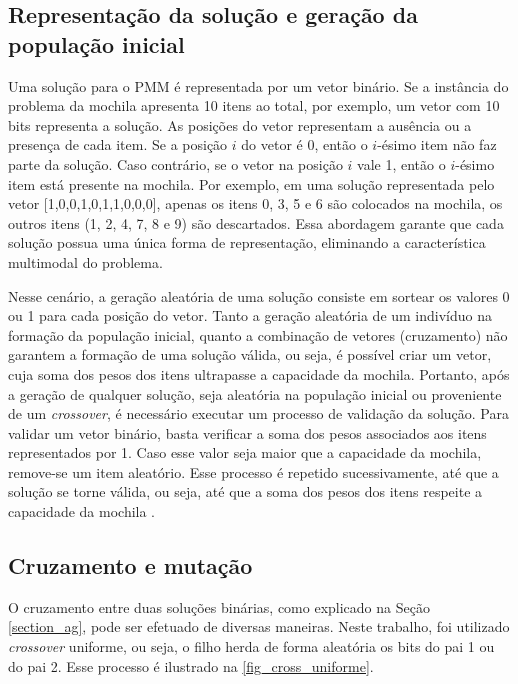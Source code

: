 \subsection{Representação da solução e geração da população inicial}
\label{section_representacao_pmm}
Uma solução para o PMM é representada por um vetor binário. Se a instância do problema da mochila apresenta 10 itens ao total, por exemplo, um vetor com 10 bits representa a solução. As posições do vetor representam a ausência ou a presença de cada item. Se a posição $i$ do vetor é 0, então o $i$-ésimo item não faz parte da solução. Caso contrário, se o vetor na posição $i$ vale 1, então o  $i$-ésimo item está presente na mochila. Por exemplo, em uma solução representada pelo vetor [1,0,0,1,0,1,1,0,0,0], apenas os itens 0, 3, 5 e 6 são colocados na mochila, os outros itens (1, 2, 4, 7, 8 e 9) são descartados. Essa abordagem garante que cada solução possua uma única forma de representação, eliminando a característica multimodal do problema.

Nesse cenário, a geração aleatória de uma solução consiste em sortear os valores 0 ou 1 para cada posição do vetor. Tanto a geração aleatória de um indivíduo na formação da população inicial, quanto a combinação de vetores (cruzamento) não garantem a formação de uma solução válida, ou seja, é possível criar um vetor, cuja soma dos pesos dos itens ultrapasse a capacidade da mochila. Portanto, após a geração de qualquer solução, seja aleatória na população inicial ou proveniente de um \textit{crossover}, é necessário executar um processo de validação da solução. Para validar um vetor binário, basta verificar a soma dos pesos associados aos itens representados por 1. Caso esse valor seja maior que a capacidade da mochila, remove-se um item aleatório. Esse processo é repetido sucessivamente, até que a solução se torne válida, ou seja, até que a soma dos pesos dos itens respeite a capacidade da mochila \cite{Ishibuchi2015}.

\subsection{Cruzamento e mutação}
O cruzamento entre duas soluções binárias, como explicado na Seção \ref{section_ag}, pode ser efetuado de diversas maneiras. Neste trabalho, foi utilizado \textit{crossover} uniforme, ou seja, o filho herda de forma aleatória os bits do pai 1 ou do pai 2. Esse processo é ilustrado na \autoref{fig_cross_uniforme}.

